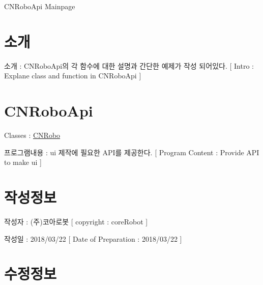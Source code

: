 C\-N\-Robo\-Api Mainpage \hypertarget{index_intro}{}\section{소개}\label{index_intro}

\begin{DoxyItemize}
\item 소개 \-: C\-N\-Robo\-Api의 각 함수에 대한 설명과 간단한 예제가 작성 되어있다. \mbox{[} Intro \-: Explane class and function in C\-N\-Robo\-Api \mbox{]} 
\end{DoxyItemize}\hypertarget{index_CNRoboApi}{}\section{C\-N\-Robo\-Api}\label{index_CNRoboApi}

\begin{DoxyItemize}
\item Classes \-: \hyperlink{classCNRobo}{C\-N\-Robo}
\item 프로그램내용 \-: ui 제작에 필요한 A\-P\-I를 제공한다. \mbox{[} Program Content \-: Provide A\-P\-I to make ui \mbox{]} 
\end{DoxyItemize}\hypertarget{index_CREATEINFO}{}\section{작성정보}\label{index_CREATEINFO}

\begin{DoxyItemize}
\item 작성자 \-: (주)코아로봇 \mbox{[} copyright \-: core\-Robot \mbox{]}
\item 작성일 \-: 2018/03/22 \mbox{[} Date of Preparation \-: 2018/03/22 \mbox{]} 
\end{DoxyItemize}\hypertarget{index_MODIFYINFO}{}\section{수정정보}\label{index_MODIFYINFO}

